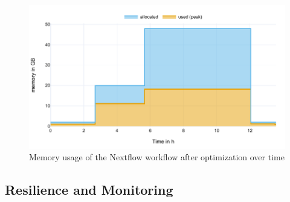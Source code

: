 \begin{figure}[H]
    \centering
	\includegraphics[width=\linewidth,height=\textheight,keepaspectratio]{pipeline_benchmark_memory_v4_aoc}
	\caption{Memory usage of the Nextflow workflow after optimization over time}
	\label{figure:pipeline_benchmark_memory_aoc_v04}
\end{figure}

\subsection{Resilience and Monitoring}\label{subsection:resilienceandmonitoring}

